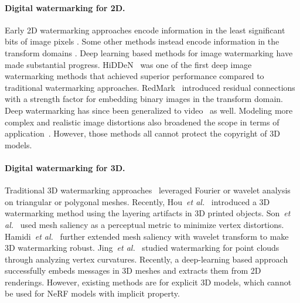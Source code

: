 \documentclass[10pt,twocolumn,letterpaper]{article}
\def\etal{{\emph{et al.}}}
\def\etal{\emph{ et al.}}
\def\etal{{\emph{et al.}}}
\begin{document}
\paragraph{Digital watermarking for 2D.} Early 2D watermarking approaches encode information in the least signiﬁcant bits of image pixels \cite{413536}. Some other methods instead encode information in the transform domains \cite{lai2010digital}. Deep learning based methods for image watermarking have made substantial progress. HiDDeN~\cite{zhu2018hidden} was one of the first deep image watermarking methods that achieved superior performance compared to traditional watermarking approaches. RedMark~\cite{ahmadi2020redmark} introduced residual connections with a strength factor for
embedding binary images in the transform domain. Deep watermarking has since been generalized to video~\cite{weng2019high,zhang2019robust} as well. Modeling more complex and realistic image distortions also broadened the scope in terms of application~\cite{wengrowski2019light,tancik2020stegastamp}. However, those methods all cannot protect the copyright of 3D models.

\paragraph{Digital watermarking for 3D.} Traditional 3D watermarking approaches~\cite{ohbuchi2002frequency,praun1999robust,wu20153d} leveraged Fourier or wavelet analysis on triangular or polygonal meshes. Recently, Hou~\etal~\cite{hou2017blind} introduced a 3D watermarking method using the layering artifacts in 3D printed objects. Son~\etal~\cite{son2017perceptual} used mesh saliency as a perceptual metric to minimize vertex distortions. Hamidi~\etal~\cite{hamidi2019blind} further extended mesh saliency with wavelet transform to make 3D watermarking robust. Jing~\etal~\cite{liu2019novel} studied watermarking for point clouds through analyzing vertex curvatures. Recently, a deep-learning based approach \cite{Yoo_2022_CVPR} successfully embeds messages in 3D meshes and extracts them from 2D renderings. However, existing methods are for explicit 3D models, which cannot be used for NeRF models with implicit property.
\end{document}
